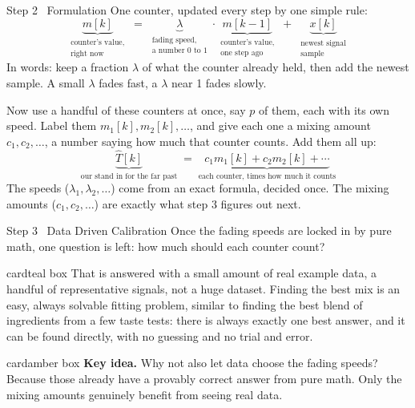 \documentclass[10pt,aspectratio=169]{beamer}
\newcommand{\ideacard}[1]{%
  \begin{beamercolorbox}[wd=\linewidth,sep=0.9em,rounded=true]{cardamber box}
  {\color{amberAccent}\textbf{Key idea.}} #1
  \end{beamercolorbox}}
\newcommand{\saycard}[1]{%
  \begin{beamercolorbox}[wd=\linewidth,sep=0.9em,rounded=true]{cardteal box}
  #1
  \end{beamercolorbox}}
\begin{document}
\begin{frame}{Step 2 \textbar\ Formulation}
  \small One counter, updated every step by one simple rule:
  \[
  \underbrace{m[k]}_{\substack{\text{counter's value,}\\\text{right now}}} \;=\; \underbrace{\lambda}_{\substack{\text{fading speed,}\\\text{a number 0 to 1}}} \cdot \underbrace{m[k-1]}_{\substack{\text{counter's value,}\\\text{one step ago}}} \;+\; \underbrace{x[k]}_{\substack{\text{newest signal}\\\text{sample}}}
  \]
  In words: keep a fraction $\lambda$ of what the counter already held, then add the newest sample. A small $\lambda$ fades fast, a $\lambda$ near 1 fades slowly.

  \vspace{0.3em}
  Now use a handful of these counters at once, say $p$ of them, each with its own speed. Label them $m_1[k], m_2[k], \dots$, and give each one a mixing amount $c_1, c_2, \dots$, a number saying how much that counter counts. Add them all up:
  \[
  \underbrace{\hat T[k]}_{\text{our stand in for the far past}} \;=\; \underbrace{c_1 m_1[k] + c_2 m_2[k] + \cdots}_{\text{each counter, times how much it counts}}
  \]
  \small\color{slate} The speeds ($\lambda_1,\lambda_2,\dots$) come from an exact formula, decided once. The mixing amounts ($c_1,c_2,\dots$) are exactly what step 3 figures out next.
\end{frame}

\begin{frame}{Step 3 \textbar\ Data Driven Calibration}
  Once the fading speeds are locked in by pure math, one question is left: how much should each counter count?

  \vspace{0.4em}
  \saycard{That is answered with a small amount of real example data, a handful of representative signals, not a huge dataset. Finding the best mix is an easy, always solvable fitting problem, similar to finding the best blend of ingredients from a few taste tests: there is always exactly one best answer, and it can be found directly, with no guessing and no trial and error.}

  \vspace{0.4em}
  \ideacard{Why not also let data choose the fading speeds? Because those already have a provably correct answer from pure math. Only the mixing amounts genuinely benefit from seeing real data.}
\end{frame}
\end{document}
